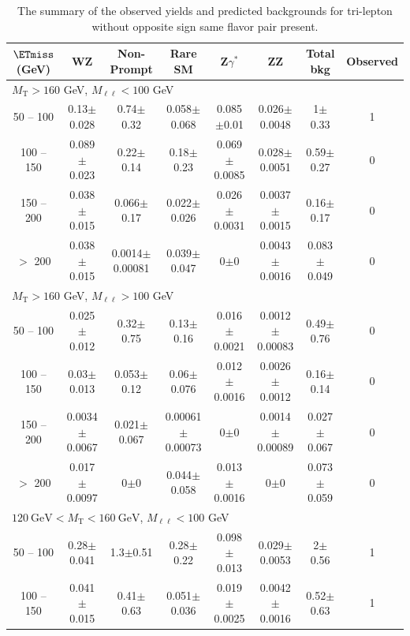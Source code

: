 \begin{landscape}
\begin{table}
\end{table}
\begin{table}
\begin{center}
\caption{\label{tab:OSSF0tau0} The summary of the observed yields and predicted backgrounds for tri-lepton 
without opposite sign same flavor pair present. }
\begin{tabular}{| c | c c c c c c c | }\hline\hline
$\ETmiss$ (GeV) & WZ & Non-Prompt & Rare SM & Z$\gamma^*$ & ZZ & Total bkg & Observed\\\hline\hline
\multicolumn{8}{l}{$M_{\text{T}} > 160$ GeV, $M_{\ell\ell} < 100$ GeV}\\\hline\hline
50 -- 100&0.13$\pm$0.028&0.74$\pm$0.32&0.058$\pm$0.068&0.085$\pm$0.01&0.026$\pm$0.0048&1$\pm$0.33&1\\
100 -- 150&0.089$\pm$0.023&0.22$\pm$0.14&0.18$\pm$0.23&0.069$\pm$0.0085&0.028$\pm$0.0051&0.59$\pm$0.27&0\\
150 -- 200&0.038$\pm$0.015&0.066$\pm$0.17&0.022$\pm$0.026&0.026$\pm$0.0031&0.0037$\pm$0.0015&0.16$\pm$0.17&0\\
$>$ 200&0.038$\pm$0.015&0.0014$\pm$0.00081&0.039$\pm$0.047&0$\pm$0&0.0043$\pm$0.0016&0.083$\pm$0.049&0\\
\hline\hline
\multicolumn{8}{l}{$M_{\text{T}} > 160$ GeV, $M_{\ell\ell} > 100$ GeV}\\\hline\hline
50 -- 100&0.025$\pm$0.012&0.32$\pm$0.75&0.13$\pm$0.16&0.016$\pm$0.0021&0.0012$\pm$0.00083&0.49$\pm$0.76&0\\
100 -- 150&0.03$\pm$0.013&0.053$\pm$0.12&0.06$\pm$0.076&0.012$\pm$0.0016&0.0026$\pm$0.0012&0.16$\pm$0.14&0\\
150 -- 200&0.0034$\pm$0.0067&0.021$\pm$0.067&0.00061$\pm$0.00073&0$\pm$0&0.0014$\pm$0.00089&0.027$\pm$0.067&0\\
$>$ 200&0.017$\pm$0.0097&0$\pm$0&0.044$\pm$0.058&0.013$\pm$0.0016&0$\pm$0&0.073$\pm$0.059&0\\
\hline\hline
\multicolumn{8}{l}{$120~\mathrm{GeV} < M_{\text{T}} < 160~\mathrm{GeV}$, $M_{\ell\ell} < 100$ GeV}\\\hline\hline
50 -- 100&0.28$\pm$0.041&1.3$\pm$0.51&0.28$\pm$0.22&0.098$\pm$0.013&0.029$\pm$0.0053&2$\pm$0.56&1\\
100 -- 150&0.041$\pm$0.015&0.41$\pm$0.63&0.051$\pm$0.036&0.019$\pm$0.0025&0.0042$\pm$0.0016&0.52$\pm$0.63&1\\

\end{tabular}
\end{center}
\end{table}
\end{landscape}
